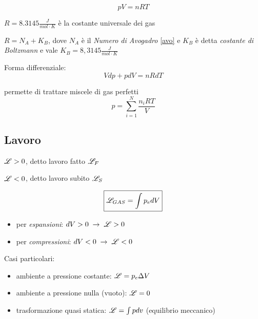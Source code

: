 \begin{equation}
    \boxed{pV = nRT}
\end{equation}

$R=8.3145 \frac{J}{mol \cdot K}$ è la costante universale dei gas
\vspace{\baselineskip}

$R=N_A + K_B$, dove $N_A$ è il \emph{Numero di Avogadro} \eqref{avo} e $K_B$ è detta \emph{costante di Boltzmann} e vale $K_B=8,3145 \frac{J}{mol \cdot K}$

\vspace{\baselineskip}
Forma differenziale:
\begin{equation}
    V dp + p dV = nR dT
\end{equation}


\vspace{\baselineskip}
 permette di trattare miscele di gas perfetti
\begin{equation}
    \boxed{p = \sum_{i=1}^{N}\frac{n_i RT}{V}}
\end{equation}

\subsection{Lavoro}
 $\mathscr{L} > 0$, detto lavoro fatto $\mathscr{L}_F$

\vspace{\baselineskip}
 $\mathscr{L} < 0$, detto lavoro subito $\mathscr{L}_S$

\vspace{\baselineskip}

\begin{equation}
    \boxed{\mathscr{L}_{GAS} = \int p_e dV}
\end{equation}

\begin{itemize}
    \item per \emph{espansioni}: $dV > 0 \;\to\; \mathscr{L} > 0$
    \item per \emph{compressioni}: $dV < 0 \;\to\; \mathscr{L} < 0$
\end{itemize}

Casi particolari:
\begin{itemize}
    \item ambiente a pressione costante: $\mathscr{L} = p_e \Delta V$ 
    \item ambiente a pressione nulla (vuoto): $\mathscr{L} = 0$
    \item trasformazione quasi statica: $\mathscr{L} = \int p dv$ (equilibrio meccanico)
\end{itemize}


